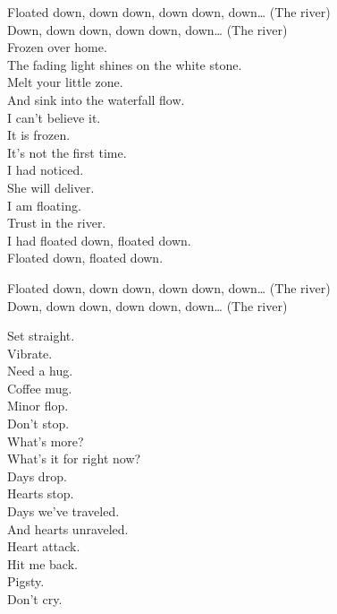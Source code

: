 
Floated down, down down, down down, down… (The river) \\
Down, down down, down down, down… (The river) \\

Frozen over home. \\
The fading light shines on the white stone. \\
Melt your little zone. \\
And sink into the waterfall flow. \\

I can't believe it. \\
It is frozen. \\
It's not the first time. \\
I had noticed. \\
She will deliver. \\
I am floating. \\
Trust in the river. \\
I had floated down, floated down. \\
Floated down, floated down. \\


Floated down, down down, down down, down… (The river) \\
Down, down down, down down, down… (The river) \\




Set straight. \\
Vibrate. \\
Need a hug. \\
Coffee mug. \\
Minor flop. \\
Don't stop. \\

What's more? \\
What's it for right now? \\

Days drop. \\
Hearts stop. \\
Days we've traveled. \\
And hearts unraveled. \\
Heart attack. \\
Hit me back. \\
Pigsty. \\
Don't cry. \\

